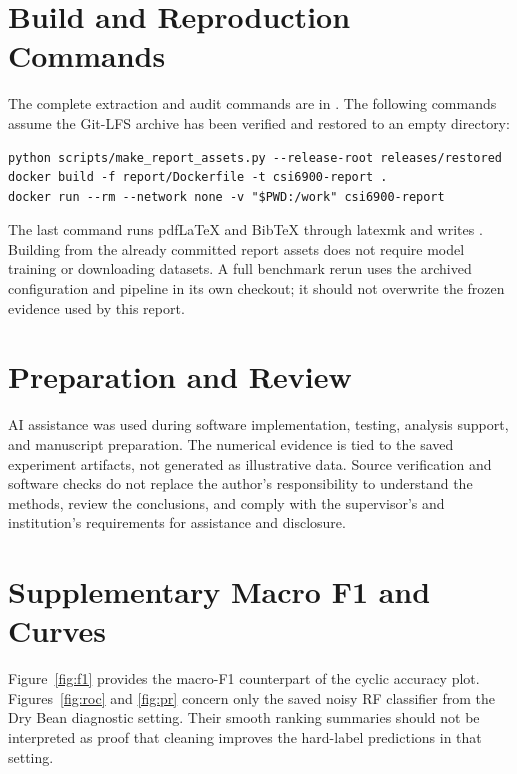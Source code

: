 \section{Build and Reproduction Commands}
The complete extraction and audit commands are in .
The following commands assume the Git-LFS archive has been verified and
restored to an empty  directory:
\begin{lstlisting}
python scripts/make_report_assets.py --release-root releases/restored
docker build -f report/Dockerfile -t csi6900-report .
docker run --rm --network none -v "$PWD:/work" csi6900-report
\end{lstlisting}
The last command runs pdfLaTeX and BibTeX through latexmk and writes
. Building from the already committed report
assets does not require model training or downloading datasets. A full
benchmark rerun uses the archived configuration and pipeline in its own
checkout; it should not overwrite the frozen evidence used by this report.

\section{Preparation and Review}
AI assistance was used during software implementation, testing, analysis
support, and manuscript preparation. The numerical evidence is tied to the
saved experiment artifacts, not generated as illustrative data. Source
verification and software checks do not replace the author's responsibility
to understand the methods, review the conclusions, and comply with the
supervisor's and institution's requirements for assistance and disclosure.

\section{Supplementary Macro F1 and Curves}
Figure~\ref{fig:f1} provides the macro-F1 counterpart of the cyclic accuracy
plot. Figures~\ref{fig:roc} and \ref{fig:pr} concern only the saved noisy RF
classifier from the Dry Bean diagnostic setting. Their smooth ranking
summaries should not be interpreted as proof that cleaning improves the
hard-label predictions in that setting.

